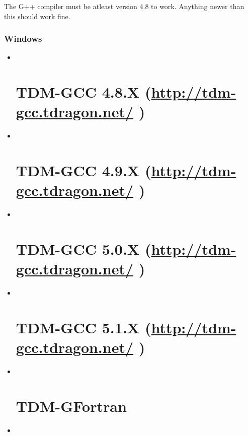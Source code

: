 \documentclass[a4paper,11pt,twoside,pdftex,draft]{article}
\begin{document}
The G++ compiler must be atleast version 4.8 to work. Anything newer
than this should work fine.

\hypertarget{windows}{%
\subsubsection[Windows]{\texorpdfstring{\protect\hypertarget{anchor-7}{}{}Windows}{Windows}}\label{windows}}

\begin{itemize}
\item ~
  \hypertarget{tdm-gcc-4.8.x-httptdm-gcc.tdragon.net}{%
  \section{\texorpdfstring{TDM-GCC 4.8.X
  (\url{http://tdm-gcc.tdragon.net/}
  )}{TDM-GCC 4.8.X (http://tdm-gcc.tdragon.net/ )}}\label{tdm-gcc-4.8.x-httptdm-gcc.tdragon.net}}
\item ~
  \hypertarget{tdm-gcc-4.9.x-httptdm-gcc.tdragon.net}{%
  \section[TDM-GCC 4.9.X (\url{http://tdm-gcc.tdragon.net/}
  )]{\texorpdfstring{\protect\hypertarget{anchor-8}{}{}TDM-GCC 4.9.X
  (\url{http://tdm-gcc.tdragon.net/}
  )}{TDM-GCC 4.9.X (http://tdm-gcc.tdragon.net/ )}}\label{tdm-gcc-4.9.x-httptdm-gcc.tdragon.net}}
\item ~
  \hypertarget{tdm-gcc-5.0.x-httptdm-gcc.tdragon.net}{%
  \section{\texorpdfstring{TDM-GCC 5.0.X
  (\url{http://tdm-gcc.tdragon.net/}
  )}{TDM-GCC 5.0.X (http://tdm-gcc.tdragon.net/ )}}\label{tdm-gcc-5.0.x-httptdm-gcc.tdragon.net}}
\item ~
  \hypertarget{tdm-gcc-5.1.x-httptdm-gcc.tdragon.net}{%
  \section{\texorpdfstring{TDM-GCC 5.1.X
  (\url{http://tdm-gcc.tdragon.net/}
  )}{TDM-GCC 5.1.X (http://tdm-gcc.tdragon.net/ )}}\label{tdm-gcc-5.1.x-httptdm-gcc.tdragon.net}}
\item ~
  \hypertarget{tdm-gfortran}{%
  \section{TDM-GFortran}\label{tdm-gfortran}}
\item ~
  \hypertarget{aqtime3-performance-profiling}{%
}
\end{itemize}
\end{document}
